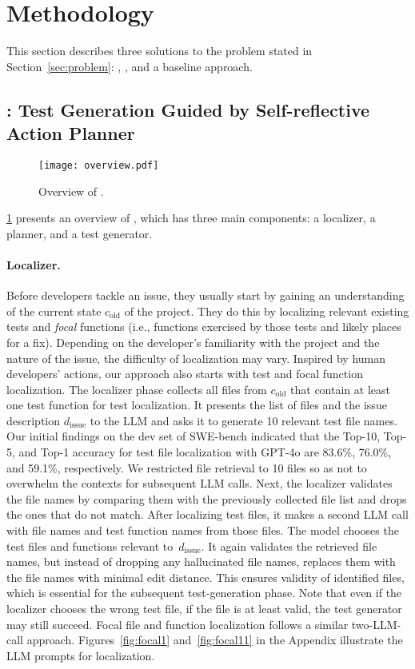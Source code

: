 \section{Methodology}\label{sec:method}

This section describes three solutions to the problem stated in
Section~\ref{sec:problem}: \solx, \soly, and a baseline approach.

\subsection{\solx: Test Generation Guided by Self-reflective Action Planner}

\begin{figure}[t]
  \centerline{\texttt{[image: overview.pdf]}}
  \caption{\label{fig:overview}Overview of \solx.}
\end{figure}

\cref{fig:overview} presents an overview of \solx, which has three main
components: a localizer, a planner, and a test generator.

\paragraph{Localizer.}

Before developers tackle an issue, they usually start by
gaining an understanding of the current state $c_\mathrm{old}$ of the
project.
They do this by localizing relevant existing tests and \emph{focal}
functions (i.e., functions exercised by those tests and likely places
for a fix).
Depending on the developer's familiarity with the project and the
nature of the issue, the difficulty of localization may vary.
Inspired by human developers' actions, our approach also starts with
test and focal function localization.
The localizer phase collects all files from $c_\mathrm{old}$
that contain at least one test function for test localization.
It presents the list of files and the issue description
$d_\mathrm{issue}$ to the LLM and asks it to generate 10
relevant test file names. Our initial findings on the dev set of SWE-bench
indicated that the Top-10, Top-5, and Top-1 accuracy for test file localization
with GPT-4o are 83.6\%, 76.0\%, and 59.1\%, respectively.
We restricted file retrieval to 10 files so as not to overwhelm the
contexts for subsequent LLM calls.
Next, the localizer validates the file names by comparing them with
the previously collected file list and drops the ones that do not match.
After localizing test files, it makes a second LLM call with
file names and test function names from those files. The model chooses the
test files and functions relevant to~$d_\mathrm{issue}$.
It again validates
the retrieved file names, but instead of dropping any hallucinated file names,
replaces them with the file names with minimal edit distance. This ensures
validity of identified files, which is essential for the subsequent
test-generation phase.
Note that even if the localizer chooses the wrong test file, if the
file is at least valid, the test generator may still succeed.
Focal file and function localization follows a similar two-LLM-call approach.
Figures~\ref{fig:focal1} and~\ref{fig:focal11} in the Appendix illustrate the LLM prompts
for localization.

